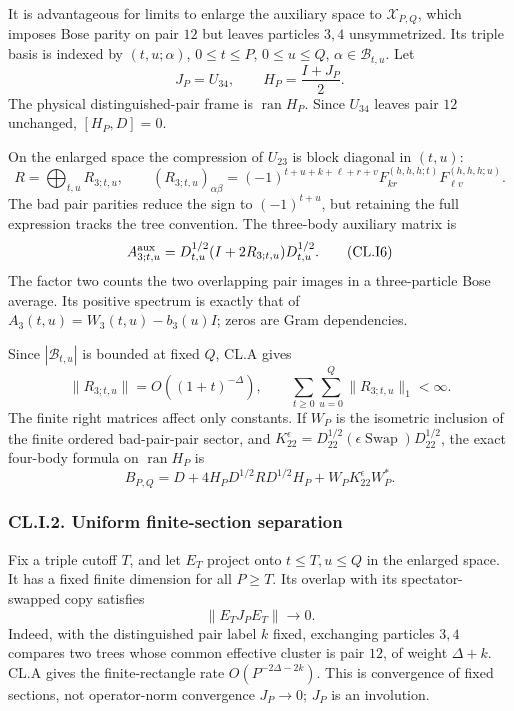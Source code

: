 It is advantageous for limits to enlarge the auxiliary space to \(\mathcal X_{P,Q}\), which imposes Bose parity on pair \(12\) but leaves particles \(3,4\) unsymmetrized. Its triple basis is indexed by \((t,u;\alpha)\), \(0\leq t\leq P\), \(0\leq u\leq Q\), \(\alpha\in\mathcal B_{t,u}\). Let \[
J_P=U_{34},\qquad H_P=\frac{I+J_P}{2}.
\] The physical distinguished-pair frame is \(\operatorname{ran}H_P\). Since \(U_{34}\) leaves pair \(12\) unchanged, \([H_P,D]=0\).

On the enlarged space the compression of \(U_{23}\) is block diagonal in \((t,u)\): \[
R=\bigoplus_{t,u}R_{3;t,u},\qquad
(R_{3;t,u})_{\alpha\beta}
=(-1)^{t+u+k+\ell+r+v}
F_{kr}^{(h,h,h;t)}F_{\ell v}^{(h,h,h;u)}.
\tag{CL.I5}
\] The bad pair parities reduce the sign to \((-1)^{t+u}\), but retaining the full expression tracks the tree convention. The three-body auxiliary matrix is \[
A_{3;t,u}^{\rm aux}
=D_{t,u}^{1/2}(I+2R_{3;t,u})D_{t,u}^{1/2}.
\tag{CL.I6}
\] The factor two counts the two overlapping pair images in a three-particle Bose average. Its positive spectrum is exactly that of \(A_3(t,u)=W_3(t,u)-b_3(u)I\); zeros are Gram dependencies.

Since \(|\mathcal B_{t,u}|\) is bounded at fixed \(Q\), CL.A gives \[
\|R_{3;t,u}\|=O((1+t)^{-\Delta}),\qquad
\sum_{t\geq0}\sum_{u=0}^Q\|R_{3;t,u}\|_1<\infty.
\tag{CL.I7}
\] The finite right matrices affect only constants. If \(W_P\) is the isometric inclusion of the finite ordered bad-pair-pair sector, and \(K_{22}^\epsilon=D_{22}^{1/2}(\epsilon\operatorname{Swap})D_{22}^{1/2}\), the exact four-body formula on \(\operatorname{ran}H_P\) is \[
B_{P,Q}
=D+4H_PD^{1/2}RD^{1/2}H_P+W_PK_{22}^{\epsilon}W_P^*.
\tag{CL.I8}
\]

\hypertarget{cl.i.2.-uniform-finite-section-separation}{%
\subsubsection{CL.I.2. Uniform finite-section separation}\label{cl.i.2.-uniform-finite-section-separation}}

Fix a triple cutoff \(T\), and let \(E_T\) project onto \(t\leq T,u\leq Q\) in the enlarged space. It has a fixed finite dimension for all \(P\geq T\). Its overlap with its spectator-swapped copy satisfies \[
\|E_TJ_PE_T\|\longrightarrow0.
\tag{CL.I9}
\] Indeed, with the distinguished pair label \(k\) fixed, exchanging particles \(3,4\) compares two trees whose common effective cluster is pair \(12\), of weight \(\Delta+k\). CL.A gives the finite-rectangle rate \(O(P^{-2\Delta-2k})\). This is convergence of fixed sections, not operator-norm convergence \(J_P\to0\); \(J_P\) is an involution.

